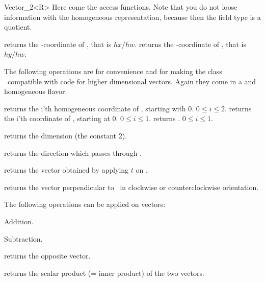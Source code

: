 \begin{ccRefClass} {Vector_2<R>}
Here come the  access functions.  Note that you do not loose
information with the homogeneous representation, because then the field
type is a quotient.

       {returns the -coordinate of \ccVar, that is $hx/hw$.}
\ccGlue
{}
       {returns the -coordinate of \ccVar, that is $hy/hw$.}

The following operations are for convenience and for making the
class \ccRefName\ compatible with code for higher dimensional vectors.
Again they come in a  and homogeneous flavor.

       {returns the i'th homogeneous coordinate of \ccVar, starting with 0.
        \ccPrecond $0\leq i \leq 2$.}
\ccGlue
{}
       {returns the i'th  coordinate of \ccVar, starting at 0.
        \ccPrecond $0\leq i \leq 1$.}
\ccGlue
{}
       {returns  .
        \ccPrecond $0\leq i \leq 1$.}

       {returns the dimension (the constant 2).}

       {returns the direction which passes through \ccVar.}

       {returns the vector obtained by applying $t$ on \ccVar.}

       {returns the vector perpendicular to \ccVar\ in clockwise or
        counterclockwise orientation.}


The following operations can be applied on vectors:

       {Addition.}

       {Subtraction.}

       {returns the opposite vector.}

       {returns the scalar product (= inner product) of the two vectors.}



\end{ccRefClass}
